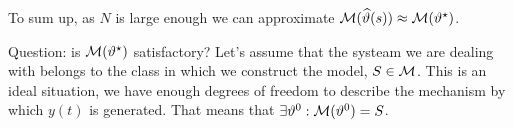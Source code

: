 To sum up, as $N$ is large enough we can approximate $\mathcal{M}(\widehat{\vartheta}(s))\approx\mathcal{M}(\vartheta ^{\star})$.

Question: is $\mathcal{M}(\vartheta^{\star})$ satisfactory? Let's assume that the systeam we are dealing with belongs to the class in which we construct the model, $S\in \mathcal{M}$. This is an ideal situation, we have enough degrees of freedom to describe the mechanism by which $y(t)$ is generated. That means that $\exists\vartheta^{0}: \mathcal{M}(\vartheta^{0}) = S$.